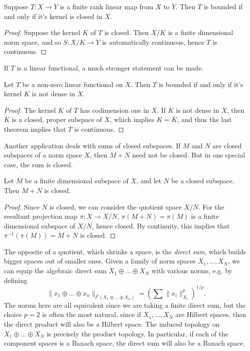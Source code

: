 \begin{theorem}
    Suppose $T: X \to Y$ is a finite rank linear map from $X$ to $Y$. Then $T$ is bounded if and only if it's kernel is closed in $X$.
\end{theorem}
\begin{proof}
    Suppose the kernel $K$ of $T$ is closed. Then $X/K$ is a finite dimensional norm space, and so $S: X/K \to Y$ is automatically continuous, hence $T$ is continuous.
\end{proof}

If $T$ is a linear functional, a much stronger statement can be made.

\begin{theorem}
    Let $T$ be a non-zero linear functional on $X$. Then $T$ is bounded if and only if it's kernel $K$ is not dense in $X$.
\end{theorem}
\begin{proof}
    The kernel $K$ of $T$ has codimension one in $X$. If $K$ is not dense in $X$, then $\overline{K}$ is a closed, proper subspace of $X$, which implies $K = \overline{K}$, and thus the last theorem implies that $T$ is continuous.
\end{proof}

Another application deals with sums of closed subspaces. If $M$ and $N$ are closed subspaces of a norm space $X$, then $M + N$ need not be closed. But in one special case, the sum is closed.

\begin{theorem}
    Let $M$ be a finite dimensional subspace of $X$, and let $N$ be a closed subspace. Then $M + N$ is closed.
\end{theorem}
\begin{proof}
    Since $N$ is closed, we can consider the quotient space $X/N$. For the resultant projection map $\pi: X \to X/N$, $\pi(M + N) = \pi(M)$ is a finite dimensional subspace of $X/N$, hence closed. By continuity, this implies that $\pi^{-1}(\pi(M)) = M + N$ is closed.
\end{proof}

The opposite of a quotient, which shrinks a space, is the \emph{direct sum}, which builds bigger spaces out of smaller ones. Given a family of norm spaces $X_1, \dots, X_N$, we can equip the algebraic direct sum $X_1 \oplus \dots \oplus X_N$ with various norms, e.g. by defining
%
\[ \| x_1 \oplus \dots \oplus x_n \|_{l^p(X_1 \oplus \dots \oplus X_n)} = \left( \sum \| x_i \|_{X_i}^p \right)^{1/p}. \]
%
The norms here are all equivalent since we are taking a finite direct sum, but the choice $p = 2$ is often the most natural, since if $X_1, \dots, X_N$ are Hilbert spaces, then the direct product will also be a Hilbert space. The induced topology on $X_1 \oplus \dots \oplus X_N$ is precisely the product topology. In particular, if each of the component spaces is a Banach space, the direct sum will also be a Banach space.


